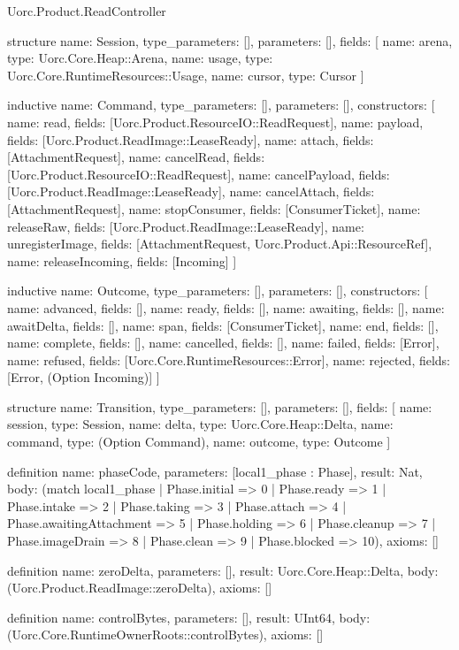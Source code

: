 \begin{lexlean}{Uorc.Product.ReadController}
\begin{semanticmodule}
structure{
  name: Session,
  type_parameters: [],
  parameters: [],
  fields: [
    {name: arena, type: Uorc.Core.Heap::Arena},
    {name: usage, type: Uorc.Core.RuntimeResources::Usage},
    {name: cursor, type: Cursor}
  ]
}

inductive{
  name: Command,
  type_parameters: [],
  parameters: [],
  constructors: [
    {name: read, fields: [Uorc.Product.ResourceIO::ReadRequest]},
    {name: payload, fields: [Uorc.Product.ReadImage::LeaseReady]},
    {name: attach, fields: [AttachmentRequest]},
    {name: cancelRead, fields: [Uorc.Product.ResourceIO::ReadRequest]},
    {name: cancelPayload, fields: [Uorc.Product.ReadImage::LeaseReady]},
    {name: cancelAttach, fields: [AttachmentRequest]},
    {name: stopConsumer, fields: [ConsumerTicket]},
    {name: releaseRaw, fields: [Uorc.Product.ReadImage::LeaseReady]},
    {name: unregisterImage, fields: [AttachmentRequest, Uorc.Product.Api::ResourceRef]},
    {name: releaseIncoming, fields: [Incoming]}
  ]
}

inductive{
  name: Outcome,
  type_parameters: [],
  parameters: [],
  constructors: [
    {name: advanced, fields: []},
    {name: ready, fields: []},
    {name: awaiting, fields: []},
    {name: awaitDelta, fields: []},
    {name: span, fields: [ConsumerTicket]},
    {name: end, fields: []},
    {name: complete, fields: []},
    {name: cancelled, fields: []},
    {name: failed, fields: [Error]},
    {name: refused, fields: [Uorc.Core.RuntimeResources::Error]},
    {name: rejected, fields: [Error, (Option Incoming)]}
  ]
}

structure{
  name: Transition,
  type_parameters: [],
  parameters: [],
  fields: [
    {name: session, type: Session},
    {name: delta, type: Uorc.Core.Heap::Delta},
    {name: command, type: (Option Command)},
    {name: outcome, type: Outcome}
  ]
}

definition{
  name: phaseCode,
  parameters: [local1_phase : Phase],
  result: Nat,
  body: (match local1_phase
    | Phase.initial => 0
    | Phase.ready => 1
    | Phase.intake => 2
    | Phase.taking => 3
    | Phase.attach => 4
    | Phase.awaitingAttachment => 5
    | Phase.holding => 6
    | Phase.cleanup => 7
    | Phase.imageDrain => 8
    | Phase.clean => 9
    | Phase.blocked => 10),
  axioms: []
}

definition{
  name: zeroDelta,
  parameters: [],
  result: Uorc.Core.Heap::Delta,
  body: (Uorc.Product.ReadImage::zeroDelta),
  axioms: []
}

definition{
  name: controlBytes,
  parameters: [],
  result: UInt64,
  body: (Uorc.Core.RuntimeOwnerRoots::controlBytes),
  axioms: []
}


\end{semanticmodule}
\end{lexlean}
